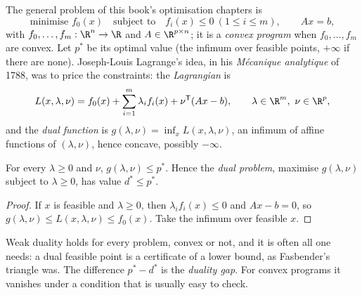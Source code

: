 The general problem of this book's optimisation chapters is
\begin{equation}\label{eq:primalconvex}
\text{minimise }f_0(x)\quad\text{subject to}\quad f_i(x)\le0\ (1\le i\le m),\qquad Ax=b,
\end{equation}
with $f_0,\dots,f_m:\R^n\to\R$ and $A\in\R^{p\times n}$; it is a \emph{convex program} when $f_0,\dots,f_m$ are convex. Let $p^*$ be its optimal value (the infimum over feasible points,
$+\infty$ if there are none). Joseph-Louis Lagrange's idea, in his \emph{M\'ecanique analytique} of 1788, was to price the constraints: the \emph{Lagrangian} is
\[
L(x,\lambda,\nu)=f_0(x)+\sum_{i=1}^m\lambda_if_i(x)+\nu^{\mathsf T}(Ax-b),\qquad\lambda\in\R^m,\ \nu\in\R^p,
\]
and the \emph{dual function} is $g(\lambda,\nu)=\inf_xL(x,\lambda,\nu)$, an infimum of affine functions of $(\lambda,\nu)$, hence concave, possibly $-\infty$.

\begin{proposition}\label{prop:weakdualityc}
For every $\lambda\ge0$ and $\nu$, $g(\lambda,\nu)\le p^*$. Hence the \emph{dual problem}, maximise $g(\lambda,\nu)$ subject to $\lambda\ge0$, has value $d^*\le p^*$.
\end{proposition}
\begin{proof}
If $x$ is feasible and $\lambda\ge0$, then $\lambda_if_i(x)\le0$ and $Ax-b=0$, so $g(\lambda,\nu)\le L(x,\lambda,\nu)\le f_0(x)$. Take the infimum over feasible $x$.
\end{proof}

Weak duality holds for every problem, convex or not, and it is often all one needs: a dual feasible point is a certificate of a lower bound, as Fasbender's
triangle was. The difference $p^*-d^*$ is the \emph{duality gap}. For convex programs it vanishes under a condition that is usually easy to check.

